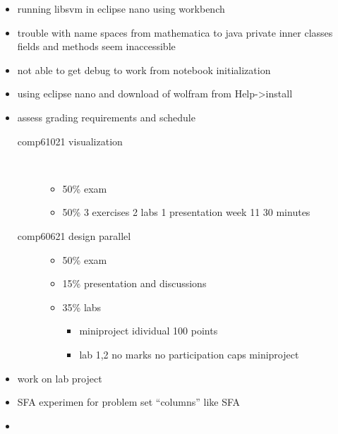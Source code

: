 \documentclass[hyperref]{labbook}
\begin{document}

\begin{itemize}
\item running libsvm in eclipse nano using workbench
\item trouble with name spaces from mathematica to java private inner classes fields and methods seem inaccessible
\item not able to get debug to work from notebook initialization
\item using eclipse nano and download of wolfram from Help->install  
\end{itemize}


\begin{itemize}
\item assess grading requirements and schedule
  \begin{description}
  \item[comp61021 visualization]\
    \begin{itemize}
    \item 50\% exam
    \item 50\% 3 exercises 2 labs 1 presentation week 11 30 minutes
    \end{itemize}
  \item[comp60621 design parallel ] 
    \begin{itemize}
    \item 50\% exam
    \item 15\% presentation and discussions
    \item 35\% labs \
      \begin{itemize}
      \item miniproject idividual  100 points
      \item lab 1,2 no marks no participation caps miniproject
      \end{itemize}

    \end{itemize}
  \end{description}

\end{itemize}

\begin{itemize}
\item work on lab project
\item SFA experimen for problem set ``columns'' like SFA
\end{itemize}
\subexperiment{parallel design}
\begin{itemize}
\item 
\end{itemize}
\end{document}
